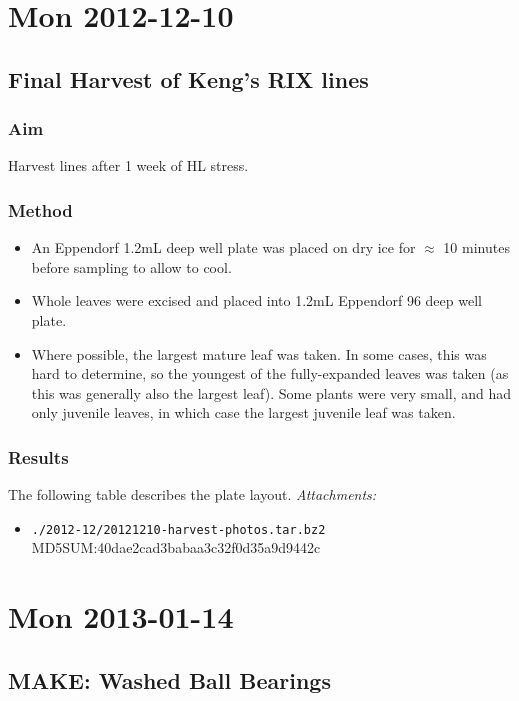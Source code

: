 \documentclass[12pt,a4paper]{book}
\begin{document}
\chapter*{Mon 2012-12-10}
  \section*{Final Harvest of Keng's RIX lines}
    \subsection*{Aim}
      Harvest lines after 1 week of HL stress.
    \subsection*{Method}
      \begin{itemize} \itemsep1pt \parskip0pt 
        \item An Eppendorf 1.2mL deep well plate was placed on dry ice for $\approx$ 10 minutes before
          sampling to allow to cool.
        \item Whole leaves were excised and placed into 1.2mL Eppendorf 96 deep well plate.
        \item Where possible, the largest mature leaf was taken. In some cases, this was hard to
          determine, so the youngest of the fully-expanded leaves was taken (as this was generally
          also the largest leaf). Some plants were very small, and had only juvenile leaves, in which
          case the largest juvenile leaf was taken.
      \end{itemize}
    \subsection*{Results}
    The following table describes the plate layout.
    \emph{Attachments:}
    \begin{itemize} \itemsep1pt \parskip0pt 
      \item \verb+./2012-12/20121210-harvest-photos.tar.bz2+ \hfill MD5SUM:40dae2cad3babaa3c32f0d35a9d9442c
    \end{itemize}

\chapter*{Mon 2013-01-14}
  \section*{MAKE: Washed Ball Bearings}
\end{document}
